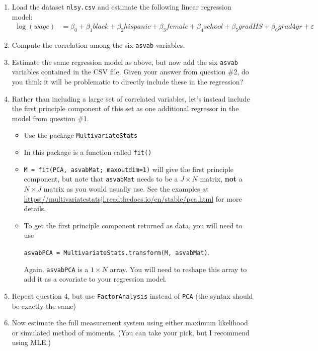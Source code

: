 \documentclass[12pt,english]{article}
\begin{document}
\begin{enumerate}
\item Load the dataset \texttt{nlsy.csv} and estimate the following linear regression model:
\begin{align*}
    \log(wage) &= \beta_0 + \beta_1 black + \beta_2 hispanic + \beta_3 female + \beta_4 school + \beta_5 gradHS + \beta_6 grad4yr + \varepsilon
\end{align*}

\item Compute the correlation among the six \texttt{asvab} variables.

\item Estimate the same regression model as above, but now add the six \texttt{asvab} variables contained in the CSV file. Given your answer from question \#2, do you think it will be problematic to directly include these in the regression?

\item Rather than including a large set of correlated variables, let's instead include the first principle component of this set as one additional regressor in the model from question \#1.
\begin{itemize}
    \item Use the package \texttt{MultivariateStats}
    \item In this package is a function called \texttt{fit()}
    \item \texttt{M = fit(PCA, asvabMat; maxoutdim=1)} will give the first principle component, but note that \texttt{asvabMat} needs to be a $J\times N$ matrix, \textbf{not} a $N\times J$ matrix as you would usually use. See the examples at \url{https://multivariatestatsjl.readthedocs.io/en/stable/pca.html} for more details.
    \item To get the first principle component returned as data, you will need to use
    
    \texttt{asvabPCA = MultivariateStats.transform(M, asvabMat)}.
    
    Again, \texttt{asvabPCA} is a $1 \times N$ array. You will need to reshape this array to add it as a covariate to your regression model.
\end{itemize}

\item Repeat question 4, but use \texttt{FactorAnalysis} instead of \texttt{PCA} (the syntax should be exactly the same)

\item Now estimate the full measurement system using either maximum likelihood or simulated method of moments. (You can take your pick, but I recommend using MLE.) 
 

\end{enumerate}
\end{document}
